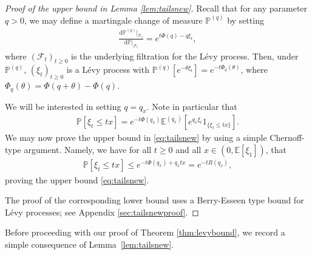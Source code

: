 \documentclass[a4,12pt]{amsart}
\numberwithin{equation}{section}
\begin{document}
\begin{proof}[Proof of the upper bound in Lemma \ref{lem:tailsnew}]
		Recall that for any parameter $q > 0$, we may define a 
		martingale change of measure $\mathbb{P}^{(q)}$ by setting
	\begin{align*}
		\frac{ \mathrm{d}\mathbb{P}^{(q)}|_{\mathcal{F}_{t}} }{ \mathrm{d} \mathbb{P}|_{\mathcal{F}_{t}}} = e^{ t \Phi(q) - q \xi_t },
	\end{align*}
	where $(\mathcal{F}_t)_{t \geq 0}$ is the underlying filtration for the L\'evy process. 
	Then, under $\mathbb{P}^{(q)}$, $(\xi_t)_{t \geq 0}$ is a L\'evy process with 
	$\mathbb{P}^{(q)} [ e^{ - \theta \xi_t} ] = e^{ - t \Phi_q(\theta)}$, where $\Phi_q(\theta) = \Phi(q+\theta) - \Phi(q)$. 

	We will be interested in setting $ q = q_x$. 
	Note in particular that
	\begin{align*}
		\mathbb{P}[ \xi_t \leq tx] = e^{ - t \Phi(q_x) } \mathbb{E}^{(q_x)} \left[ e^{q_x \xi_t } \mathrm{1}_{\{\xi_t \leq tx\}}\right].
	\end{align*}
	We may now prove the upper bound in \eqref{eq:tailsnew} by using a simple Chernoff-type argument. 
	Namely,  we have for all $t\geq 0$ and all $x\in (0, \mathbb{E}[\xi_1])$, that 
	\begin{align*}
		\mathbb{P}[ \xi_t \leq tx] \leq e^{ - t \Phi(q_x) + q_x tx } = e^{ - t R(q_x)},
	\end{align*}
	proving the upper bound \eqref{eq:tailsnew}. 

    The proof of the corresponding lower bound uses a Berry-Esseen type bound for L\'evy processes; see Appendix \ref{sec:tailsnewproof}.
\end{proof}
    
    Before proceeding with our proof of Theorem \ref{thm:levybound}, we record a 
\color{black}
simple consequence  
	of Lemma~\ref{lem:tailsnew}.
\end{document}
